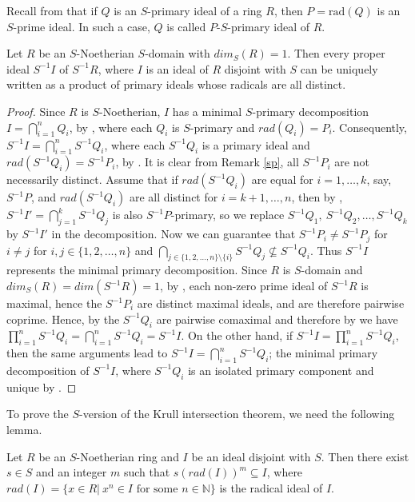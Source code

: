 \documentclass[11pt]{article}
\begin{document}
\noindent
Recall from \cite[Proposition 2.5]{me22} that if $Q$ is an $S$-primary ideal of a ring $R$, then $P=\text{rad}(Q)$ is an $S$-prime ideal. In such a case,  $Q$ is called  $P$-$S$-primary ideal of $R$.
	\begin{theorem}\label{produt}
		Let $R$ be an $S$-Noetherian $S$-domain with $dim_{S}(R)=1$. Then every proper ideal $S^{-1}I$ of  $S^{-1}R$, where $I$ is an ideal of $R$ disjoint with $S$ can be uniquely written as a product of primary ideals whose radicals are all distinct.
	\end{theorem}
	\begin{proof}
		Since $R$ is $S$-Noetherian, $I$ has a minimal $S$-primary decomposition $I=\bigcap\limits_{i=1}^{n}Q_{i}$, by \cite[Theorem 9]{ts24}, where each $Q_{i}$ is $S$-primary and $rad(Q_{i})=P_{i}$. Consequently, $S^{-1}I= \bigcap\limits_{i=1}^{n}S^{-1}Q_{i}$, where each $S^{-1}Q_{i}$ is a primary ideal and $rad(S^{-1}Q_{i})=S^{-1}P_{i}$, by \cite[Remark 11]{ts24}. It is clear from Remark \ref{sp}, all $S^{-1}P_{i}$ are not necessarily distinct. Assume that if $rad(S^{-1}Q_{{i}})$ are equal for $i=1,\ldots, k$, say, $S^{-1}P$, and $rad(S^{-1}Q_{{i}})$ are all distinct for $i=k+1,\ldots, n$, then by \cite[Lemma 4.3]{fm69}, $S^{-1}I'=\bigcap\limits_{j=1}^{k}S^{-1}Q_{{j}}$ is also $S^{-1}P$-primary, so we replace $S^{-1}Q_{{1}}, ~S^{-1}Q_{{2}}, \ldots, S^{-1}Q_{{k}}$ by $S^{-1}I'$ in the decomposition. Now we can guarantee that $S^{-1}P_i\neq S^{-1}P_{j}$ for $i \neq j$ for $i, j\in\{1, 2, \ldots, n\}$ and $ \bigcap_{j\in\{1,2,\ldots,n\}\setminus\{i\}}S^{-1}Q_{j}\nsubseteq S^{-1}Q_{i}$. Thus $S^{-1}I$ represents the minimal primary decomposition. Since $R$ is $S$-domain and $dim_{S}(R)=dim(S^{-1}R)=1$, by \cite[Theorem 4.11]{ki24}, each non-zero prime ideal of $S^{-1}R$ is maximal, hence the $S^{-1}P_{i}$ are distinct maximal ideals, and are therefore pairwise coprime. Hence, by \cite[Proposition 1.16]{fm69} the $S^{-1}Q_{i}$ are pairwise comaximal  and therefore by \cite[Proposition 1.10]{fm69} we have $\prod_{i=1}^{n}S^{-1}Q_{i}=\bigcap\limits_{i=1}^{n}S^{-1}Q_{i}=S^{-1}I$.
		On the other hand, if $S^{-1}I=\prod_{i=1}^{n}S^{-1}Q_{i}$, then the same arguments lead to $S^{-1}I=\bigcap\limits_{i=1}^{n}S^{-1}Q_{i}$; the minimal primary decomposition of $S^{-1}I$, where $S^{-1}Q_{i}$ is an isolated primary component and unique by \cite[Corollary 4.11]{fm69}.
	\end{proof}
	To prove the $S$-version of the Krull intersection theorem, we need the following lemma. 
	\begin{lem}\label{pmsb}
		Let $R$ be an $S$-Noetherian ring and $I$ be an ideal disjoint with $S$. Then there exist $s\in S$ and an integer $m$ such that $s(rad(I))^m\subseteq I$, where $rad(I)=\{x\in R| \ x^n\in I \text{ for some } n\in \mathbb{N}\}$ is the radical ideal of $I$.
	\end{lem}
\end{document}
